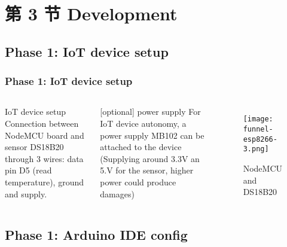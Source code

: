 \documentclass[
    aspectratio=169,                   %
]{beamer}
\begin{document}
\section{第 3 节 Development}

\subsection{Phase 1: IoT device setup}

    \begin{frame}
        \frametitle{Phase 1: IoT device setup}

        \begin{columns}[T,onlytextwidth]
              \begin{block}{IoT device setup}
                    Connection between NodeMCU board and sensor DS18B20 through 3 wires: data pin D5 (read temperature), ground and supply.
                \end{block}
                \begin{block}{[optional] power supply}
                    For IoT device autonomy, a power supply MB102 can be attached to the device (Supplying around 3.3V an 5.V for the sensor,  higher power could produce damages)
                \end{block}
            \begin{figure}
                \centering
                \begin{stampbox}
                    \texttt{[image: funnel-esp8266-3.png]}
                \end{stampbox}
                \caption{NodeMCU and DS18B20}
            \end{figure}        
        \end{columns}

    \end{frame}

\subsection{Phase 1: Arduino IDE config}
\end{document}
